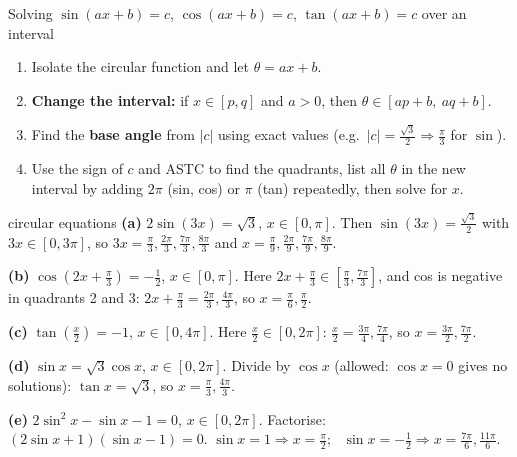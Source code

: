 \begin{method}{Solving $\sin(ax+b)=c$, $\cos(ax+b)=c$, $\tan(ax+b)=c$ over an interval \byhand}
\begin{enumerate}
  \item Isolate the circular function and let $\theta=ax+b$.
  \item \textbf{Change the interval:} if $x\in[p,q]$ and $a>0$, then $\theta\in[ap+b,\ aq+b]$.
  \item Find the \textbf{base angle} from $|c|$ using exact values (e.g.\ $|c|=\frac{\sqrt3}{2}\Rightarrow\frac{\pi}{3}$ for $\sin$).
  \item Use the sign of $c$ and ASTC to find the quadrants, list all $\theta$ in the new interval by adding $2\pi$ (sin, cos) or $\pi$ (tan) repeatedly, then solve for $x$.
\end{enumerate}
\end{method}

\begin{example}{circular equations \byhand}
\textbf{(a)} $2\sin(3x)=\sqrt3$, $x\in[0,\pi]$. Then $\sin(3x)=\frac{\sqrt3}{2}$ with $3x\in[0,3\pi]$, so $3x=\frac{\pi}{3},\frac{2\pi}{3},\frac{7\pi}{3},\frac{8\pi}{3}$ and $x=\frac{\pi}{9},\frac{2\pi}{9},\frac{7\pi}{9},\frac{8\pi}{9}$.\par
\textbf{(b)} $\cos\!\left(2x+\frac{\pi}{3}\right)=-\frac12$, $x\in[0,\pi]$. Here $2x+\frac{\pi}{3}\in\left[\frac{\pi}{3},\frac{7\pi}{3}\right]$, and cos is negative in quadrants 2 and 3: $2x+\frac{\pi}{3}=\frac{2\pi}{3},\frac{4\pi}{3}$, so $x=\frac{\pi}{6},\frac{\pi}{2}$.\par
\textbf{(c)} $\tan\!\left(\frac x2\right)=-1$, $x\in[0,4\pi]$. Here $\frac x2\in[0,2\pi]$: $\frac x2=\frac{3\pi}{4},\frac{7\pi}{4}$, so $x=\frac{3\pi}{2},\frac{7\pi}{2}$.\par
\textbf{(d)} $\sin x=\sqrt3\cos x$, $x\in[0,2\pi]$. Divide by $\cos x$ (allowed: $\cos x=0$ gives no solutions): $\tan x=\sqrt3$, so $x=\frac{\pi}{3},\frac{4\pi}{3}$.\par
\textbf{(e)} $2\sin^2x-\sin x-1=0$, $x\in[0,2\pi]$. Factorise: $(2\sin x+1)(\sin x-1)=0$. $\sin x=1\Rightarrow x=\frac{\pi}{2}$; \ $\sin x=-\frac12\Rightarrow x=\frac{7\pi}{6},\frac{11\pi}{6}$.
\end{example}

